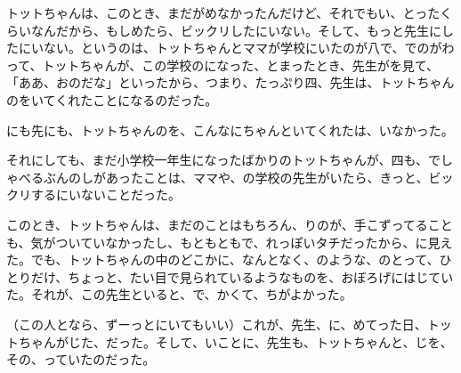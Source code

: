 トットちゃんは、このとき、まだがめなかったんだけど、それでもい、とったくらいなんだから、もしめたら、ビックリしたにいない。そして、もっと先生にしたにいない。というのは、トットちゃんとママが学校にいたのが八で、でのがわって、トットちゃんが、この学校のになった、とまったとき、先生がを見て、「ああ、おのだな」といったから、つまり、たっぷり四、先生は、トットちゃんのをいてくれたことになるのだった。

にも先にも、トットちゃんのを、こんなにちゃんといてくれたは、いなかった。

それにしても、まだ小学校一年生になったばかりのトットちゃんが、四も、でしゃべるぶんのしがあったことは、ママや、の学校の先生がいたら、きっと、ビックリするにいないことだった。

このとき、トットちゃんは、まだのことはもちろん、りのが、手こずってることも、気がついていなかったし、もともともで、れっぽいタチだったから、に見えた。でも、トットちゃんの中のどこかに、なんとなく、のような、のとって、ひとりだけ、ちょっと、たい目で見られているようなものを、おぼろげにはじていた。それが、この先生といると、で、かくて、ちがよかった。

（この人となら、ずーっとにいてもいい）これが、先生、に、めてった日、トットちゃんがじた、だった。そして、いことに、先生も、トットちゃんと、じを、その、っていたのだった。



